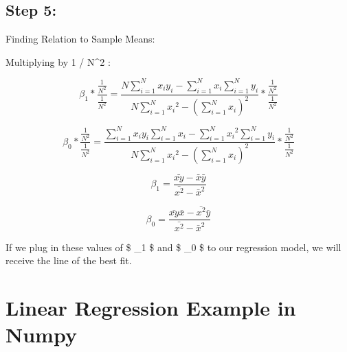 \documentclass[11pt]{article}
\begin{document}
\hypertarget{step-5}{%
\subsection{Step 5:}\label{step-5}}

Finding Relation to Sample Means:

Multiplying by 1 / N\^{}2 :

\[ \beta_1 * \frac{\frac{1}{N^2}}{\frac{1}{N^2}} = \frac{N\sum_{i=1}^{N}{x_i y_i} - \sum_{i=1}^{N}{x_i} \sum_{i=1}^{N}{y_i}}{N\sum_{i=1}^{N}{{x_i}^2} -  {(\sum_{i=1}^{N}{x_i})}^2} * \frac{\frac{1}{N^2}}{\frac{1}{N^2}} \]

\[ \beta_0 *\frac{\frac{1}{N^2}}{\frac{1}{N^2}} = \frac{\sum_{i=1}^{N}{x_i y_i}\sum_{i=1}^{N}{x_i} - \sum_{i=1}^{N}{{x_i}^2} \sum_{i=1}^{N}{y_i}}{N\sum_{i=1}^{N}{{x_i}^2} -  {(\sum_{i=1}^{N}{x_i})}^2} * \frac{\frac{1}{N^2}}{\frac{1}{N^2}} \]

\[ \beta_1 = \frac{\bar{xy} - \bar{x}\bar{y}}{{\bar{x^2}} - \bar{x}^2} \]

\[ \beta_0 = \frac{\bar{xy}\bar{x} - \bar{x^2}\bar{y}}{\bar{x^2} - \bar{x}^2} \]

    If we plug in these values of \$ \beta\_1 \$ and \$ \beta\_0 \$ to our
regression model, we will receive the line of the best fit.

    \hypertarget{linear-regression-example-in-numpy}{%
\section{Linear Regression Example in
Numpy}\label{linear-regression-example-in-numpy}}
\end{document}

